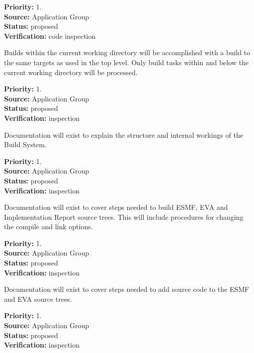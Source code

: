 \begin{reqlist}
{\bf Priority:} 1. \\
{\bf Source:} Application Group \\
{\bf Status:} proposed \\
{\bf Verification:} code inspection
\end{reqlist}

Builds within the current working directory will be
accomplished with a build to the same targets as
used in the top level.
Only build tasks within and below the current working directory
will be processed.  
\begin{reqlist}
{\bf Priority:} 1. \\
{\bf Source:} Application Group \\
{\bf Status:} proposed \\
{\bf Verification:} inspection
\end{reqlist}

Documentation will exist to explain the structure and 
internal workings of the Build System.
\begin{reqlist}
{\bf Priority:} 1. \\
{\bf Source:} Application Group \\
{\bf Status:} proposed \\
{\bf Verification:} inspection
\end{reqlist}

Documentation will exist to cover steps needed to build ESMF,
EVA and Implementation Report  source trees.  This will include procedures for 
changing the compile and link options.
\begin{reqlist}
{\bf Priority:} 1. \\
{\bf Source:} Application Group \\
{\bf Status:} proposed \\
{\bf Verification:} inspection
\end{reqlist}

Documentation will exist to cover steps needed to add source
code to the ESMF and EVA source trees.
\begin{reqlist}
{\bf Priority:} 1. \\
{\bf Source:} Application Group \\
{\bf Status:} proposed \\
{\bf Verification:} inspection
\end{reqlist}

